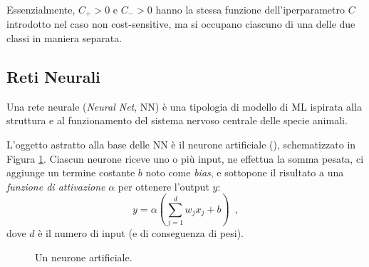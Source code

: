 Essenzialmente, $C_+ >0$ e $C_- >0$ hanno la stessa funzione dell'iperparametro $C$ introdotto nel caso non cost-sensitive, ma si occupano ciascuno di una delle due classi in maniera separata.









\subsection{Reti Neurali}
\label{par:nn}
Una rete neurale (\textit{Neural Net}, NN) è una tipologia di modello di ML ispirata alla struttura e al funzionamento del sistema nervoso centrale delle specie animali.

L'oggetto astratto alla base delle NN è il neurone artificiale (\cite{mcculloch1943}), schematizzato in Figura \ref{fig:neuron}. Ciascun neurone riceve uno o più input, ne effettua la somma pesata, ci aggiunge un termine costante $b$ noto come \textit{bias}, e sottopone il risultato a una \textit{funzione di attivazione} $\alpha$ per ottenere l'output $y$:
\begin{equation}
    y = \alpha \left(\sum_{j=1}^d w_j x_j + b \right) \enspace ,
    \label{expr:neuron-output}
\end{equation}
dove $d$ è il numero di input (e di conseguenza di pesi).

\begin{figure}[ht]
    \centering
    \caption{Un neurone artificiale.}
    \label{fig:neuron}
\end{figure}

